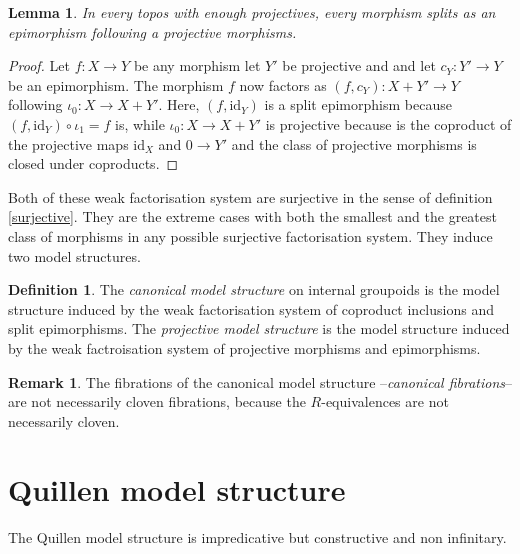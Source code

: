 \documentclass{amsart}
\theoremstyle{plain}
\newtheorem{lemma}[theorem]{Lemma}
\theoremstyle{definition}
\newtheorem{defin}[theorem]{Definition}
\newtheorem{remark}[theorem]{Remark}
\newcommand\id{\mathrm{id}}
\begin{document}
\begin{lemma} In every topos with enough projectives, every morphism splits as an epimorphism following a projective morphisms. \end{lemma}

\begin{proof} Let $f:X\to Y$ be any morphism let $Y'$ be projective and and let $c_Y:Y'\to Y$ be an epimorphism. The morphism $f$ now factors as $(f,c_Y):X+Y'\to Y$ following $\iota_0:X\to X+Y'$. Here, $(f,\id_Y)$ is a split epimorphism because $(f,\id_Y)\circ \iota_1 = f$ is, while $\iota_0:X\to X+Y'$ is projective because is the coproduct of the projective maps $\id_X$ and $0\to Y'$ and the class of projective morphisms is closed under coproducts.
\end{proof}



Both of these weak factorisation system are surjective in the sense of definition \ref{surjective}. They are the extreme cases with both the smallest and the greatest class of morphisms in any possible surjective factorisation system. They induce two model structures.

\begin{defin} The \emph{canonical model structure} on internal groupoids is the model structure induced by the weak factorisation system of coproduct inclusions and split epimorphisms. The \emph{projective model structure} is the model structure induced by the weak factroisation system of projective morphisms and epimorphisms.
\end{defin}

\begin{remark} The fibrations of the canonical model structure --\emph{canonical fibrations}--are not necessarily cloven fibrations, because the $R$-equivalences are not necessarily cloven. %
\end{remark}

\section{Quillen model structure}
The Quillen model structure is impredicative but constructive and non infinitary.  
\end{document}
